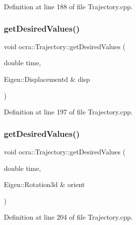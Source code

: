 Definition at line 188 of file Trajectory.\+cpp.

\hypertarget{classocra_1_1Trajectory_a5e9026bd9eb9a50f820fd561d7783c59}{}\label{classocra_1_1Trajectory_a5e9026bd9eb9a50f820fd561d7783c59} 
\subsubsection{\texorpdfstring{get\+Desired\+Values()}{getDesiredValues()}\hspace{0.1cm}{\footnotesize\ttfamily [4/6]}}
{\footnotesize\ttfamily void ocra\+::\+Trajectory\+::get\+Desired\+Values (\begin{DoxyParamCaption}\item[{double}]{time,  }\item[{Eigen\+::\+Displacementd \&}]{disp }\end{DoxyParamCaption})}



Definition at line 197 of file Trajectory.\+cpp.

\hypertarget{classocra_1_1Trajectory_a05e7abae6b5dead3d5382bef15d0c803}{}\label{classocra_1_1Trajectory_a05e7abae6b5dead3d5382bef15d0c803} 
\subsubsection{\texorpdfstring{get\+Desired\+Values()}{getDesiredValues()}\hspace{0.1cm}{\footnotesize\ttfamily [5/6]}}
{\footnotesize\ttfamily void ocra\+::\+Trajectory\+::get\+Desired\+Values (\begin{DoxyParamCaption}\item[{double}]{time,  }\item[{Eigen\+::\+Rotation3d \&}]{orient }\end{DoxyParamCaption})}



Definition at line 204 of file Trajectory.\+cpp.

\hypertarget{classocra_1_1Trajectory_af81c6d351f25f49ae02028d0ee9b34bd}{}\label{classocra_1_1Trajectory_af81c6d351f25f49ae02028d0ee9b34bd} 
